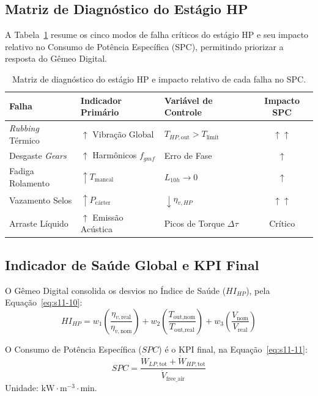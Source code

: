 \documentclass[12pt,a4paper]{article}
\numberwithin{equation}{section}
\numberwithin{table}{section}
\numberwithin{figure}{section}
\begin{document}
	\subsection{\textbf{Matriz de Diagnóstico do Estágio HP}}

	A Tabela~\ref{tab:11-1} resume os cinco modos de falha críticos do estágio HP e seu impacto relativo no Consumo de Potência Específica (SPC), permitindo priorizar a resposta do Gêmeo Digital.
	\begin{table}[h!tbp]
		\centering
		\small
		\renewcommand{\arraystretch}{1.5}
		\begin{tabular}{l l l c}
			\toprule
			\textbf{Falha} & \textbf{Indicador Primário} & \textbf{Variável de Controle} & \textbf{Impacto SPC} \\ \midrule
			\textit{Rubbing} Térmico & $\uparrow$ Vibração Global & $T_{HP,\text{out}} > T_{\text{limit}}$ & $\uparrow \uparrow$ \\
			Desgaste \textit{Gears} & $\uparrow$ Harmônicos $f_{gmf}$ & Erro de Fase & $\uparrow$ \\
			Fadiga Rolamento & $\uparrow T_{\text{mancal}}$ & $L_{10h} \to 0$ & $\uparrow$ \\
			Vazamento Selos & $\uparrow P_{\text{cárter}}$ & $\downarrow \eta_{v,HP}$ & $\uparrow \uparrow$ \\
			Arraste Líquido & $\uparrow$ Emissão Acústica & Picos de Torque $\Delta \tau$ & Crítico \\ \bottomrule
		\end{tabular}
		\caption[Matriz de diagnóstico do estágio HP]{Matriz de diagnóstico do estágio HP e impacto relativo de cada falha no SPC.}
		\label{tab:11-1}
	\end{table}
	
	\subsection{\textbf{Indicador de Saúde Global e KPI Final}}
	O Gêmeo Digital consolida os desvios no Índice de Saúde ($HI_{HP}$), pela Equação~\eqref{eq:s11-10}:
	\begin{equation}\label{eq:s11-10}
 HI_{HP} = w_1 \left( \frac{\eta_{v,\text{real}}}{\eta_{v,\text{nom}}} \right) + w_2 \left( \frac{T_{\text{out,nom}}}{T_{\text{out,real}}} \right) + w_3 \left( \frac{V_{\text{nom}}}{V_{\text{real}}} \right) 
\end{equation}
	
	O Consumo de Potência Específica ($SPC$) é o KPI final, na Equação~\eqref{eq:s11-11}:
	\begin{equation}\label{eq:s11-11}
 \boxed{SPC = \frac{\dot{W}_{LP,\text{tot}} + \dot{W}_{HP,\text{tot}}}{\dot{V}_{\text{free\_air}}}} 
\end{equation}
	Unidade: $\text{kW} \cdotp \text{m}^{-3} \cdotp \text{min}$.
\end{document}
